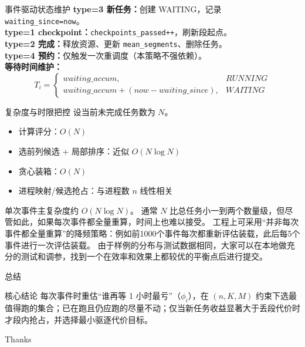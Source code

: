 \documentclass[10pt,aspectratio=169]{beamer}
\begin{document}
\begin{frame}{事件驱动状态维护}
\textbf{type=3 新任务：}创建 WAITING，记录 \texttt{waiting\_since=now}。\\
\textbf{type=1 checkpoint：}\texttt{checkpoints\_passed++}，刷新段起点。\\
\textbf{type=2 完成：}释放资源、更新 \texttt{mean\_segments}、删除任务。\\
\textbf{type=4 预约：}仅触发一次重调度（本策略不强依赖）。\\[4pt]
\textbf{等待时间维护：}
\[
T_i=\begin{cases}
waiting\_accum,& RUNNING\\
waiting\_accum+(now-waiting\_since),& WAITING
\end{cases}
\]
\end{frame}

\begin{frame}{复杂度与时限把控}
设当前未完成任务数为 $N$。
\begin{itemize}
  \item 计算评分：$O(N)$
  \item 选前列候选 + 局部排序：近似 $O(N\log N)$
  \item 贪心装箱：$O(N)$
  \item 进程映射/候选抢占：与进程数 $n$ 线性相关
\end{itemize}
单次事件主复杂度约 $O(N\log N)$。
通常 $N$ 比总任务小一到两个数量级，但尽管如此，如果每次事件都全量重算，时间上也难以接受。
工程上可采用“并非每次事件都全量重算”的降频策略：例如前1000个事件每次都重新评估装载，此后每5个事件进行一次评估装载。
由于样例的分布与测试数据相同，大家可以在本地做充分的测试和调参，找到一个在效率和效果上都较优的平衡点后进行提交。
\end{frame}

\begin{frame}{总结}
\begin{block}{核心结论}
每次事件时重估“谁再等 1 小时最亏”（$\phi_i$），在 $(n,K,M)$ 约束下选最值得跑的集合；已在跑且仍应跑的尽量不动；仅当新任务收益显著大于丢段代价时才段内抢占，并选择最小驱逐代价目标。
\end{block}
\vspace{4pt}
\centering
\Large Thanks 
\end{frame}
\end{document}
